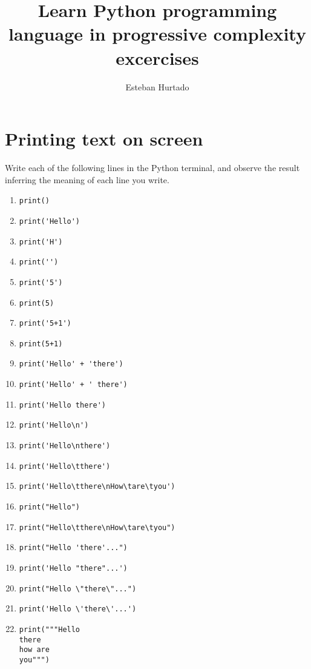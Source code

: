 \documentclass[12pt]{book}
\begin{document}
\title{Learn Python programming language in progressive complexity excercises}
\author{Esteban Hurtado}
\date{}
\maketitle

\chapter{Printing text on screen}

Write each of the following lines in the Python terminal, and observe the result inferring the meaning of each line you write.

\begin{enumerate}

\item \verb|print()|
\item \verb|print('Hello')|
\item \verb|print('H')|
\item \verb|print('')|
\item \verb|print('5')|
\item \verb|print(5)|
\item \verb|print('5+1')|
\item \verb|print(5+1)|
\item \verb|print('Hello' + 'there')|
\item \verb|print('Hello' + ' there')|
\item \verb|print('Hello there')|
\item \verb|print('Hello\n')|
\item \verb|print('Hello\nthere')|
\item \verb|print('Hello\tthere')|
\item \verb|print('Hello\tthere\nHow\tare\tyou')|
\item \verb|print("Hello")|
\item \verb|print("Hello\tthere\nHow\tare\tyou")|
\item \verb|print("Hello 'there'...")|
\item \verb|print('Hello "there"...')|
\item \verb|print("Hello \"there\"...")|
\item \verb|print('Hello \'there\'...')|
\item \begin{verbatim}
print("""Hello
there
how are
you""")
\end{verbatim}
\end{enumerate}
\end{document}
